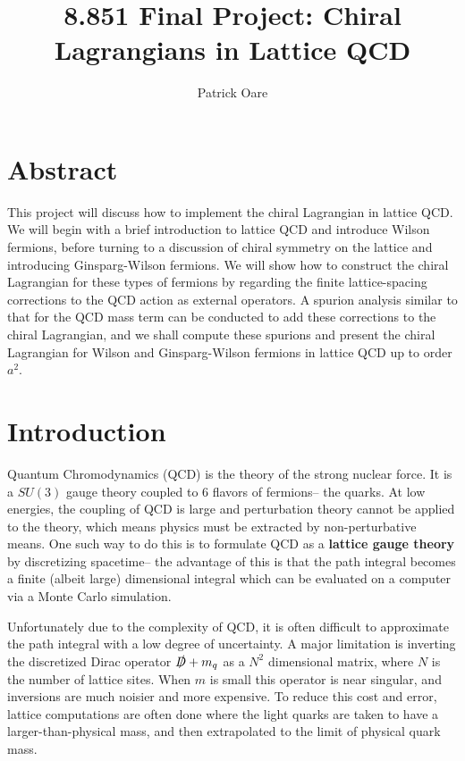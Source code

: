 \documentclass[11pt, oneside]{article}   	%
\title{8.851 Final Project: Chiral Lagrangians in Lattice QCD}
\author{Patrick Oare}
\date{}							%
\theoremstyle{definition}
\begin{document}
\maketitle

\thispagestyle{empty}

\section*{Abstract}

This project will discuss how to implement the chiral Lagrangian in lattice QCD. We will begin with a brief introduction to 
lattice QCD and introduce Wilson fermions, before turning to a discussion of chiral symmetry on the lattice and introducing 
Ginsparg-Wilson fermions. We will show how to construct the chiral Lagrangian for these types of fermions by regarding the 
finite lattice-spacing corrections to the QCD action as external operators. A spurion analysis similar to that for the QCD mass 
term can be conducted to add these corrections to the chiral Lagrangian, and we shall compute these spurions and present 
the chiral Lagrangian for Wilson and Ginsparg-Wilson fermions in lattice QCD up to order $a^2$.

\newpage
\setcounter{page}{1}

\section{Introduction}

Quantum Chromodynamics (QCD) is the theory of the strong nuclear force. It is a $SU(3)$ gauge theory coupled to 6 
flavors of fermions-- the quarks. At low energies, the coupling of QCD is large and perturbation theory cannot be applied to 
the theory, which means physics must be extracted by non-perturbative means. One such way to do this is to formulate 
QCD as a \textbf{lattice gauge theory} by discretizing spacetime-- the advantage of this is that the path integral becomes a 
finite (albeit large) dimensional integral which can be evaluated on a computer via a Monte Carlo simulation. 

Unfortunately due to the complexity of QCD, it is often difficult to approximate the path integral with a low degree of 
uncertainty. A major limitation is inverting the discretized Dirac operator $\slashed D + m_q$ as a $N^2$ dimensional matrix, 
where $N$ is the number of lattice sites. When $m$ is small this operator is near singular, and inversions are much noisier 
and more expensive. To reduce this cost and error, lattice computations are often done where the light quarks are taken to 
have a larger-than-physical mass, and then extrapolated to the limit of physical quark mass.
\end{document}
